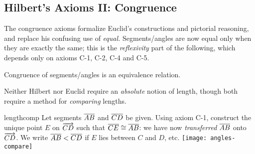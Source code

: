 \clearpage



\subsection{Hilbert's Axioms II: Congruence}\label{sec:hilbert2}

The congruence axioms formalize Euclid's constructions and pictorial reasoning, and replace his confusing use of \emph{equal.} Segments/angles are now equal only when they are exactly the same; this is the \emph{reflexivity} part of the following, which depends only on axioms C-1, C-2, C-4 and C-5.

\begin{lemm}{}{}
Congruence of segments/angles is an equivalence relation.
\end{lemm}



Neither Hilbert nor Euclid require an \emph{absolute} notion of length, though both require a method for \emph{comparing} lengths. 


\begin{defn}[lower separated=false, sidebyside, sidebyside align=top seam, sidebyside gap=0pt, righthand width=0.35\linewidth]{}{lengthcomp}
Let segments $\overline{AB}$ and $\overline{CD}$ be given.\smallbreak
Using axiom C-1, construct the unique point $E$ on $\overrightarrow{CD}$ such that $\overline{CE}\cong\overline{AB}$: we have now \emph{transferred} $\overline{AB}$ onto $\overrightarrow{CD}$.\smallbreak
We write $\overline{AB}<\overline{CD}$ if $E$ lies between $C$ and $D$, etc.
\tcblower
\flushright\texttt{[image: angles-compare]}
\end{defn}


